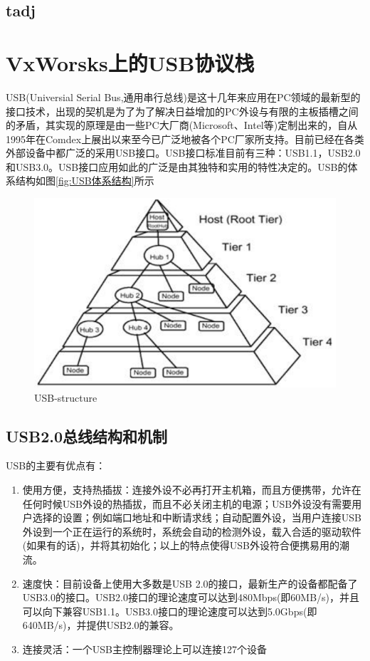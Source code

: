 \subsection{tadj}

\section{VxWorsks上的USB协议栈}
	USB(Universial Serial Bus,通用串行总线)是这十几年来应用在PC领域的最新型的接口技术，出现的契机是为了为了解决日益增加的PC外设与有限的主板插槽之间的矛盾，其实现的原理是由一些PC大厂商(Microsoft、Intel等)定制出来的，自从1995年在Comdex上展出以来至今已广泛地被各个PC厂家所支持。目前已经在各类外部设备中都广泛的采用USB接口。USB接口标准目前有三种：USB1.1，USB2.0和USB3.0。USB接口应用如此的广泛是由其独特和实用的特性决定的。USB的体系结构如图\autoref{fig:USB体系结构}所示
\begin{figure}[!h]
\centering
\includegraphics[width=.4\textwidth]{./graphics/USB-structure.png}
\caption{USB-structure}\label{fig:USB体系结构}
\end{figure}

\subsection{USB2.0总线结构和机制}
	USB的主要有优点有：
\begin{enumerate}
\item 使用方便，支持热插拔：连接外设不必再打开主机箱，而且方便携带，允许在任何时候USB外设的热插拔，而且不必关闭主机的电源；USB外设没有需要用户选择的设置；例如端口地址和中断请求线；自动配置外设，当用户连接USB外设到一个正在运行的系统时，系统会自动的检测外设，载入合适的驱动软件(如果有的话)，并将其初始化；以上的特点使得USB外设符合便携易用的潮流。
\item 速度快：目前设备上使用大多数是USB 2.0的接口，最新生产的设备都配备了USB3.0的接口。USB2.0接口的理论速度可以达到480Mbps(即60MB/s)，并且可以向下兼容USB1.1。USB3.0接口的理论速度可以达到5.0Gbps(即640MB/s)，并提供USB2.0的兼容。
\item 连接灵活：一个USB主控制器理论上可以连接127个设备
\end{enumerate}

